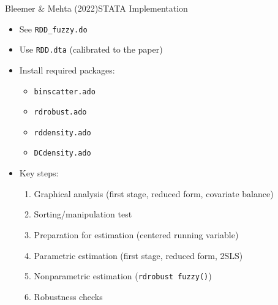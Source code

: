 \documentclass[hyperref={pdfpagelabels=false}]{beamer}
\begin{document}
\begin{frame}{Bleemer \& Mehta (2022)}{STATA Implementation}
	\begin{itemize}
		\item See \texttt{RDD\_fuzzy.do}
		\vspace{0.2cm}
		\item Use \texttt{RDD.dta} (calibrated to the paper)
		\vspace{0.2cm}
		\item Install required packages:
		\begin{itemize}
			\vspace{0.2cm}
			\item \texttt{binscatter.ado}
			\item \texttt{rdrobust.ado}
			\item \texttt{rddensity.ado}
			\item \texttt{DCdensity.ado}
		\end{itemize}
		\vspace{0.2cm}
		\item Key steps:
		\begin{enumerate}
			\vspace{0.2cm}
			\item Graphical analysis (first stage, reduced form, covariate balance)
			\item Sorting/manipulation test
			\item Preparation for estimation (centered running variable)
			\item Parametric estimation (first stage, reduced form, 2SLS)
			\item Nonparametric estimation (\texttt{rdrobust fuzzy()})
			\item Robustness checks
		\end{enumerate}
	\end{itemize}
\end{frame}
\end{document}
